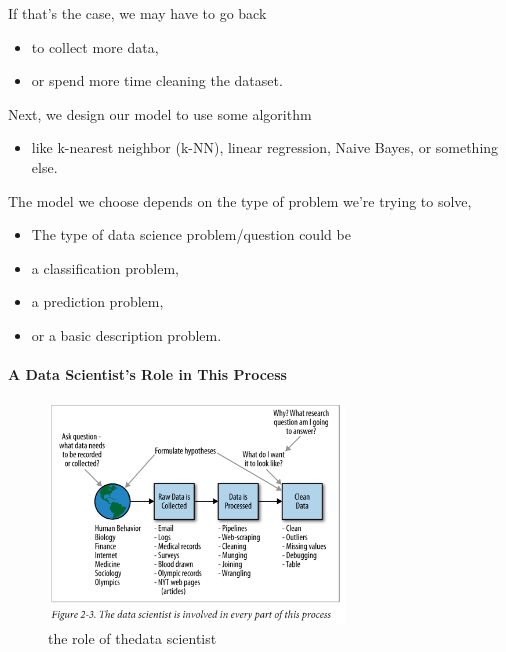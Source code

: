 \documentclass[]{article}
\providecommand{\tightlist}{%
  \setlength{\itemsep}{0pt}\setlength{\parskip}{0pt}}
\let\oldparagraph\paragraph
\renewcommand{\paragraph}[1]{\oldparagraph{#1}\mbox{}}
\begin{document}
If that's the case, we may have to go back

\begin{itemize}
\tightlist
\item
  to collect more data,
\item
  or spend more time cleaning the dataset.
\end{itemize}

Next, we design our model to use some algorithm

\begin{itemize}
\tightlist
\item
  like k-nearest neighbor (k-NN), linear regression, Naive Bayes, or
  something else.
\end{itemize}

The model we choose depends on the type of problem we're trying to
solve,

\begin{itemize}
\tightlist
\item
  The type of data science problem/question could be
\item
  a classification problem,
\item
  a prediction problem,
\item
  or a basic description problem.
\end{itemize}

\paragraph{A Data Scientist's Role in This
Process}\label{a-data-scientists-role-in-this-process}

\begin{figure}
\centering
\includegraphics[width=0.70000\textwidth]{figs/9a-4.png}
\caption{the role of thedata scientist}
\end{figure}
\end{document}
